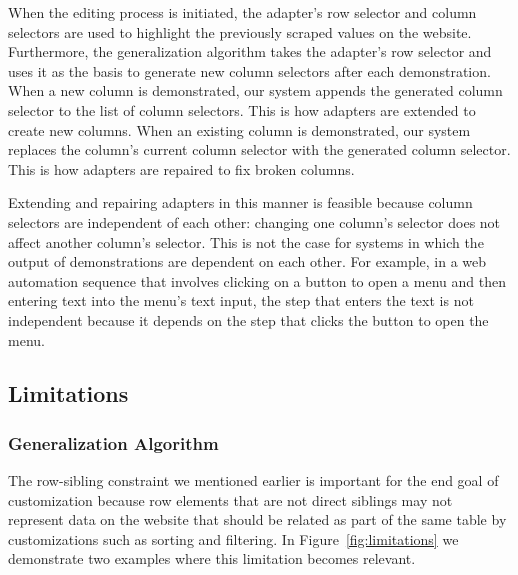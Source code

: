 \documentclass[sigconf,10pt]{acmart}
\begin{document}
When the editing process is initiated, the adapter's row selector and
column selectors are used to highlight the previously scraped values on
the website. Furthermore, the generalization algorithm takes the
adapter's row selector and uses it as the basis to generate new column
selectors after each demonstration. When a new column is demonstrated,
our system appends the generated column selector to the list of column
selectors. This is how adapters are extended to create new columns. When
an existing column is demonstrated, our system replaces the column's
current column selector with the generated column selector. This is how
adapters are repaired to fix broken columns.

Extending and repairing adapters in this manner is feasible because
column selectors are independent of each other: changing one column's
selector does not affect another column's selector. This is not the case
for systems in which the output of demonstrations are dependent on each
other. For example, in a web automation sequence that involves clicking
on a button to open a menu and then entering text into the menu's text
input, the step that enters the text is not independent because it
depends on the step that clicks the button to open the menu.

\hypertarget{limitations}{%
\subsection{Limitations}\label{limitations}}

\hypertarget{generalization-algorithm}{%
\subsubsection{Generalization
Algorithm}\label{generalization-algorithm}}

The row-sibling constraint we mentioned earlier is important for the end
goal of customization because row elements that are not direct siblings
may not represent data on the website that should be related as part of
the same table by customizations such as sorting and filtering. In
Figure~\ref{fig:limitations} we demonstrate two examples where this
limitation becomes relevant.
\end{document}
